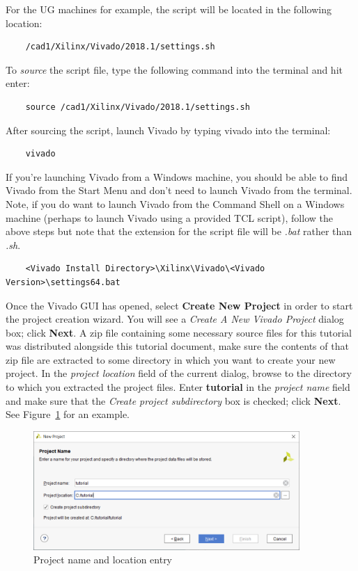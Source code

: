 \documentclass[11pt]{article}
\begin{document}
\noindent
For the UG machines for example, the script will be located in the following location:

\begin{verbatim}
    /cad1/Xilinx/Vivado/2018.1/settings.sh
\end{verbatim}

\noindent
To \textit{source} the script file, type the following command into the terminal and hit enter:

\begin{verbatim}
    source /cad1/Xilinx/Vivado/2018.1/settings.sh
\end{verbatim}

\noindent
After sourcing the script, launch Vivado by typing vivado into the terminal:

\begin{verbatim}
    vivado
\end{verbatim}

\noindent
If you're launching Vivado from a Windows machine, you should be able to find Vivado from the Start Menu and don't need to launch Vivado from the terminal. Note, if you do want to launch Vivado from the Command Shell on a Windows machine (perhaps to launch Vivado using a provided TCL script), follow the above steps but note that the extension for the script file will be \textit{.bat} rather than \textit{.sh}.

\begin{verbatim}
    <Vivado Install Directory>\Xilinx\Vivado\<Vivado Version>\settings64.bat
\end{verbatim}

\noindent
Once the Vivado GUI has opened, select \textbf{Create New Project} in order to start the project creation wizard. You will see a \textit{Create A New Vivado Project} dialog box; click \textbf{Next}. A zip file containing some necessary source files for this tutorial was distributed alongside this tutorial document, make sure the contents of that zip file are extracted to some directory in which you want to create your new project. In the \textit{project location} field of the current dialog, browse to the directory to which you extracted the project files. Enter \textbf{tutorial} in the \textit{project name} field and make sure that the \textit{Create project subdirectory} box is checked; click \textbf{Next}. See Figure~\ref{fig:new_proj_name} for an example.

\begin{figure}[!h]
    \centering
    \includegraphics[width=0.9\textwidth]{images/new_proj_name.png}
    \caption{Project name and location entry}
    \label{fig:new_proj_name}
\end{figure}
\end{document}
